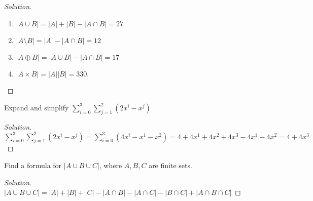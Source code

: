     \begin{proof}[Solution]
        \par
        \begin{enumerate}
            \item $|A\cup B| = |A|+|B|-|A\cap B| = 27$
            \item $|A\setminus B| = |A|-|A\cap B| = 12$
            \item $|A\oplus B| = |A\cup B|-|A\cap B| = 17$
            \item $|A\times B| = |A||B| = 330$.
        \end{enumerate}
    \end{proof}
    \begin{problem}
    Expand and simplify $\sum_{i=0}^{3}\sum_{j=1}^{2}(2x^i-x^j)$
    \end{problem}
    \begin{proof}[Solution]
    \vspace{-0.5\topsep}
    $\sum_{i=0}^{3}\sum_{j=1}^{2}(2x^i-x^j)=\sum_{i=0}^{3}(4x^{i}-x^{1}-x^{2})=4+4x^{1}+4x^{2}+4x^{3}-4x^{1}-4x^{2}=4+4x^3$
    \end{proof}
    \begin{problem}
    Find a formula for $|A\cup B\cup C|$, where $A,B,C$ are finite sets.
    \end{problem}
    \begin{proof}[Solution]
    \vspace{-0.5\topsep}
    $|A\cup B\cup C| = |A|+|B|+|C|-|A\cap B|-|A\cap C|-|B\cap C| +|A\cap B \cap C|$
    \end{proof}
